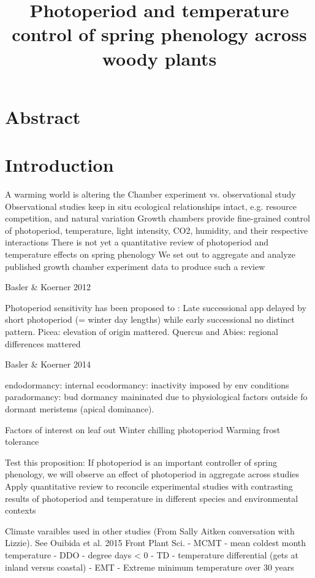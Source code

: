 \documentclass[11pt]{article}
\begin{document}
\title{Photoperiod and temperature control of spring phenology across woody plants}
\maketitle
\section*{Abstract}

\section*{Introduction}

A warming world is altering the 
Chamber experiment vs. observational study
Observational studies keep in situ ecological relationships intact, e.g. resource competition, and natural variation
Growth chambers provide fine-grained control of photoperiod, temperature, light intensity, CO2, humidity, and their respective interactions
There is not yet a quantitative review of photoperiod and temperature effects on spring phenology
We set out to aggregate and analyze published growth chamber experiment data to produce such a review


Basler \& Koerner 2012

Photoperiod sensitivity has been proposed to : Late successional app delayed by short photoperiod (= winter day lengths) while early successional no distinct pattern. 
Picea: elevation of origin mattered. 
Quercus and Abies: regional differences mattered

Basler \& Koerner 2014

endodormancy: internal
ecodormancy: inactivity imposed by env conditions
paradormancy: bud dormancy maininated due to physiological factors outside fo dormant meristems (apical dominance).

Factors of interest on leaf out 
Winter chilling
photoperiod
Warming
frost tolerance 

Test this proposition: If photoperiod is an important controller of spring phenology, we will observe an effect of photoperiod in aggregate across studies
Apply quantitative review to reconcile experimental studies with contrasting results of photoperiod and temperature in different species and environmental contexts

Climate varaibles used in other studies (From Sally Aitken conversation with Lizzie). See Ouibida et al. 2015 Front Plant Sci.
   - MCMT - mean coldest month temperature
   - DDO - degree days < 0
   - TD - temperature differential (gets at inland versus coastal)
   - EMT - Extreme minimum temperature over 30 years
\end{document}
